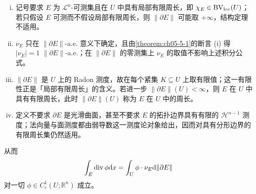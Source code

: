 \documentclass[../../main.tex]{subfiles}%
\begin{document}
\begin{remark}\label{remark:ch05-def-5-1-周长测度-条件}
\begin{enumerate}[(i)]
\item 记号要求 $E$ 为 $\mathcal{L}^n$-可测集且在 $U$ 中具有局部有限周长，即 $\chi_E\in\mathrm{BV}_{\mathrm{loc}}(U)$；若只假设 $E$ 可测而不假设局部有限周长，则 $\lVert\partial E\rVert$ 可能取 $+\infty$，结构定理不适用。
\item $\nu_E$ 只在 $\lVert\partial E\rVert$-a.e. 意义下确定，且由\cref{theorem:ch05-5-1}的断言 (i) 得 $\lvert\nu_E\rvert=1$ $\lVert\partial E\rVert$-a.e.；在 $\lVert\partial E\rVert$ 的零测集上 $\nu_E$ 的取值不影响上述积分公式。%
\item $\lVert\partial E\rVert$ 是 $U$ 上的 Radon 测度，故在每个紧集 $K\subseteq U$ 上取有限值；这一有限性正是「局部有限周长」的含义。若进一步 $\lVert\partial E\rVert(U)<\infty$，则 $E$ 在 $U$ 中具有有限周长，此时 $\lVert\partial E\rVert(U)$ 称为 $E$ 在 $U$ 中的周长。
\item 定义不要求 $\partial E$ 是光滑曲面，甚至不要求 $E$ 的拓扑边界具有有限的 $\mathcal{H}^{n-1}$ 测度；法向量与面测度都由弱导数这一测度论对象给出，因而对具有分形边界的有限周长集仍然适用。
\end{enumerate}
\end{remark}

从而
\begin{align*}
\int_E\operatorname{div}\phi\mathrm{d} x=\int_U\phi\cdot\nu_E\mathrm{d}\lVert\partial E\rVert
\end{align*}
对一切 $\phi\in C_c^1(U;\mathbb{R}^n)$ 成立。
\end{document}
